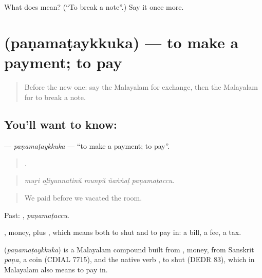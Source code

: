 \begin{tcolorbox}[breakable,colback=teal!4,colframe=teal!35!black,title={Before you move on}]
What does  mean? (\textquotedblleft{}To break a note\textquotedblright{}.) Say it once more.
\end{tcolorbox}
\section[\texorpdfstring{\ml{പണമടയ്ക്കുക} (paṇamaṭaykkuka)}{പണമടയ്ക്കുക (paṇamaṭaykkuka)}]{ (paṇamaṭaykkuka) — to make a payment; to pay}

\label{lesson:ML-C489-panamataykkuka}



\begin{quote}
Before the new one: say the Malayalam for exchange, then the Malayalam for to break a note.
\end{quote}

\subsection*{You'll want to know: }
\textbf{} — \emph{paṇamaṭaykkuka} — \textquotedblleft{}to make a payment; to pay\textquotedblright{}.

\begin{quote}
    .
\end{quote}

\begin{quote}
\emph{muṟi oḻiyunnatinŭ munpŭ ñaṅṅaḷ paṇamaṭaccu.}
\end{quote}

\begin{quote}
We paid before we vacated the room.
\end{quote}

Past: , \emph{paṇamaṭaccu}.

, money, plus , which means both to shut and to pay in: a bill, a fee, a tax.

\begin{cousinweb}
\textbf{} (\emph{paṇamaṭaykkuka}) is a Malayalam compound built from , money, from Sanskrit \emph{paṇa}, a coin (CDIAL 7715), and the native verb , to shut (DEDR 83), which in Malayalam also means to pay in.
\end{cousinweb}

